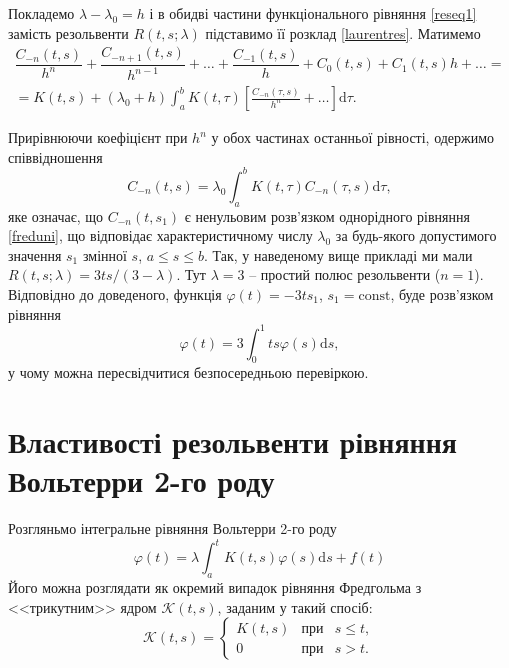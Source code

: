 \documentclass[14pt,twoside]{extreport}
\theoremstyle{mystyle}
\numberwithin{equation}{chapter}
\begin{document}
Покладемо $\lambda - \lambda_0 = h$ і в обидві частини функціонального рівняння \eqref{reseq1} замість резольвенти $R(t, s; \lambda)$ підставимо її розклад \eqref{laurentres}. Матимемо
\begin{multline*}
  \dfrac{C_{-n}(t, s) }{h^n} + \dfrac{C_{-n+1}(t, s) }{h^{n-1}} + \ldots + \dfrac{C_{-1}(t, s) }{h} + C_0(t, s) + C_1(t, s) h + \ldots =\\
  \displaystyle= K(t, s) + (\lambda_0 + h) \int_{a}^{b} K(t, \tau) \left[ \frac{C_{-n}(\tau, s)}{h^n} + \ldots\right] \mathrm{d}\tau.
\end{multline*}

Прирівнюючи коефіцієнт при $h^n$ у обох частинах останньої рівності, одержимо співвідношення
\begin{equation}\label{cminusn}
 C_{-n}(t, s) = \lambda_0 \int_{a}^{b} K(t, \tau) C_{-n}(\tau, s) \mathrm{d}\tau,
\end{equation}
яке означає, що $C_{-n}(t, s_1)$ є ненульовим розв'язком однорідного рівняння \eqref{freduni}, що відповідає характеристичному числу $\lambda_0$ за будь-якого допустимого значення $s_1$ змінної $s$, $a \leqslant s \leqslant b$. Так, у наведеному вище прикладі ми мали $R(t, s; \lambda) = 3ts/(3 - \lambda)$. Тут $\lambda = 3$ -- простий полюс резольвенти ($n = 1$).
Відповідно до доведеного, функція $\varphi (t) = -3ts_1$, $s_1 = \textrm{const}$, буде розв'язком рівняння
\[
 \varphi(t) = 3 \int_{0}^{1} ts \varphi(s) \mathrm{d}s,
\]
у чому можна пересвідчитися безпосередньою перевіркою.

\chapter{Властивості резольвенти рівняння Вольтерри 2-го роду}

Розгляньмо інтегральне рівняння Вольтерри 2-го роду
\begin{equation}\label{volt}
\varphi(t)=\lambda\int_{a}^{t} K(t,s) \varphi(s)\mathrm{d}s + f(t)
\end{equation}
Його можна розглядати як окремий випадок рівняння Фредгольма з <<трикутним>> ядром $\mathscr{K}(t, s)$, заданим у такий спосіб:
\[
\mathscr{K}(t, s) = \left\{
\begin{array}{ccc}
K(t, s) & \textrm{при} & s\leqslant t,\\
0 & \textrm{при} & s>t.
\end{array}
\right.
\]
\end{document}
